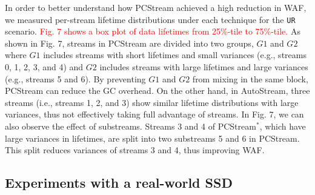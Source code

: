 In order to better understand how \textsf{\small PCStream} achieved a high reduction in WAF, 
we measured per-stream lifetime distributions under each technique for the \texttt{UR} scenario.
\textcolor{red}{
Fig. 7 shows a box plot of data lifetimes from 25\%-tile to 75\%-tile.}
As shown in Fig. 7, 
streams in \textsf{\small PCStream} are divided into two groups, 
$G1$ and $G2$ where $G1$ includes streams with short lifetimes and small variances (e.g., streams 0, 1, 2, 3, and 4) 
and $G2$ includes streams with large lifetimes and large variances (e.g., streams 5 and 6).  
By preventing $G1$ and $G2$ from mixing in the same block, 
\textsf{\small PCStream} can reduce the GC overhead.  
On the other hand, in \textsf{\small AutoStream}, 
three streams (i.e., streams 1, 2, and 3) show similar lifetime distributions with large variances, 
thus not effectively taking full advantage of streams.
In Fig. 7, we can also observe the effect of substreams.  
Streams 3 and 4 of \textsf{\small PCStream$^{*}$}, 
which have large variances in lifetimes, are split into two substreams 5 and 6 in \textsf{\small PCStream}.
This split reduces variances of streams 3 and 4, thus improving WAF. 

\vspace{-10pt}
\subsection{Experiments with a real-world SSD}


